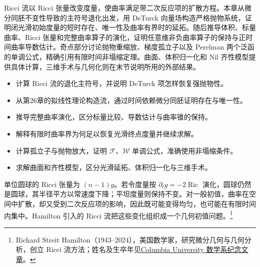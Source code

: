 
% 
% 


\begin{chapterabstract}
Ricci 流以 Ricci 张量改变度量，使曲率满足带二次反应项的扩散方程。本章从微分同胚不变性导致的主符号退化出发，用 DeTurck 向量场构造严格抛物系统，证明闭光滑初始度量的短时存在、唯一性及曲率有界时的延拓。随后推导体积、标量曲率、Ricci 张量和完整曲率算子的演化，证明任意维非负曲率算子的保持与正时间曲率导数估计。奇点部分讨论抛物重缩放、梯度孤立子以及 Perelman 两个泛函的单调公式，精确引用有限时间非塌缩定理。曲面、体积归一化和 Nil 齐性模型提供具体计算，三维手术与几何化则在末节说明所用的外部结果。
\end{chapterabstract}

\begin{learninggoals}
\begin{itemize}
\item 计算 Ricci 流的退化主符号，并说明 DeTurck 项怎样恢复强抛物性。
\item 从第26章的拟线性理论构造流，通过时间依赖微分同胚证明存在与唯一性。
\item 推导完整曲率演化，区分标量比较、导数估计与曲率锥的保持。
\item 解释有限时曲率界为何足以恢复光滑终点度量并继续求解。
\item 计算孤立子与抛物放大，证明 \(\mathcal F\)、\(\mathcal W\) 单调公式，准确使用非塌缩条件。
\item 求解曲面和齐性模型，区分光滑延拓、体积归一化与三维手术。
\end{itemize}
\end{learninggoals}

单位圆球的 Ricci 张量为 \((n-1)g\)。若令度量按 \(\partial_tg=-2\operatorname{Ric}\) 演化，圆球仍然是圆球，其半径平方以常速度下降；平坦度量则保持不变。对一般初值，曲率在空间中扩散，却又受到二次反应项的影响，因此既可能变得均匀，也可能在有限时间内集中。Hamilton 引入的 Ricci 流把这些变化组织成一个几何初值问题。\footnote{Richard Streit Hamilton（1943--2024），美国数学家，研究微分几何与几何分析，创立 Ricci 流方法；姓名及生卒年见\href{https://www.math.columbia.edu/2024/10/02/richard-streit-hamilton-1943-2024/}{Columbia University 数学系纪念文章}。}

